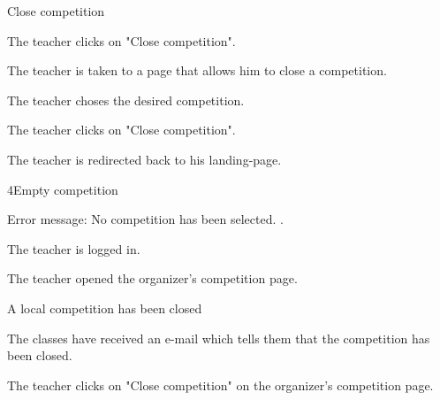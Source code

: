 \begin{uc}{Close competition}

    \begin{uc-mss}
    \item The teacher clicks on "Close competition".
    \item The teacher is taken to a page that allows him to close a competition.
    \item The teacher choses the desired competition.
    \item The teacher clicks on "Close competition".
    \item The teacher is redirected back to his landing-page.
    \end{uc-mss}

    \begin{uc-ext}

        \begin{uc-fail}{4}{Empty competition}
        \item Error message: No competition has been selected.
            .
        \end{uc-fail}

    \end{uc-ext}

    \begin{uc-pre}
        \item The teacher is logged in.
        \item The teacher opened the organizer's competition page.
    \end{uc-pre}

    \begin{uc-post}
    \item A local competition has been closed
    \item The classes have received an e-mail which tells them that the competition has been closed.
    \end{uc-post}

    \begin{uc-trig}
        The teacher clicks on "Close competition" on the organizer's competition page.
    \end{uc-trig}

\end{uc}
